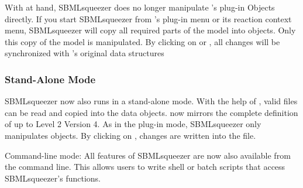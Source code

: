 With \JSBML at hand, SBMLsqueezer does no longer manipulate \CellDesigner's
plug-in Objects directly. If you start SBMLsqueezer from \CellDesigner's plug-in
menu or its reaction context menu, SBMLsqueezer will copy all required parts of
the model into \JSBML objects. Only this copy of the model is manipulated. By
clicking on  or , all changes will be synchronized with \CellDesigner's
original data structures

\subsubsection{Stand-Alone Mode}

SBMLsqueezer now also runs in a stand-alone mode. With the help of \libSBML,
valid \SBML files can be read and copied into the \JSBML data objects. \JSBML now
mirrors the complete definition of \SBML up to Level 2 Version 4. As in the
\CellDesigner plug-in mode, SBMLsqueezer only manipulates \JSBML objects. By
clicking on , changes are written into the \SBML file.

Command-line mode: All features of SBMLsqueezer are now also available from the
command line. This allows users to write shell or batch scripts that access
SBMLsqueezer's functions.

